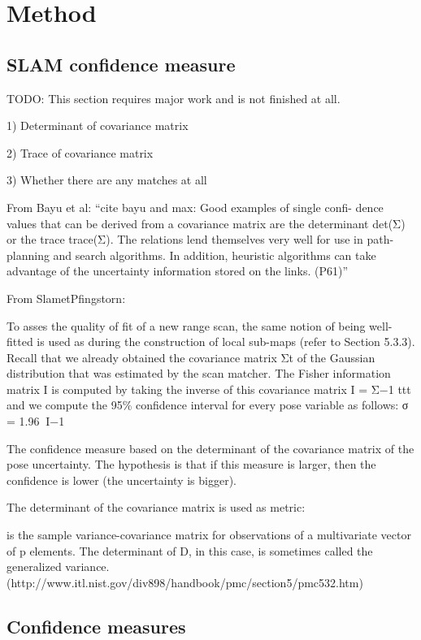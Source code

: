 \chapter{Method}
\label{method}

\section{SLAM confidence measure}
TODO: This section requires major work and is not finished at all.


1) Determinant of covariance matrix

2) Trace of covariance matrix

3) Whether there are any matches at all


From Bayu et al: ``cite bayu and max:     Good examples of single confi- dence values that can be derived from a covariance matrix are the determinant det(Σ) or the trace trace(Σ). The relations lend themselves very well for use in path-planning and search algorithms. In addition, heuristic algorithms can take advantage of the uncertainty information stored on the links. (P61)''


From SlametPfingstorn:

To asses the quality of fit
of a new range scan, the same notion of being well-fitted is used as during the construction
of local sub-maps (refer to Section 5.3.3). Recall that we already obtained the covariance
matrix Σt of the Gaussian distribution that was estimated by the scan matcher. The Fisher
information matrix I is computed by taking the inverse of this covariance matrix I = Σ−1 ttt
and we compute the 95\% confidence interval for every pose variable as follows: σ = 1.96􏰌􏰀I−1􏰁



The confidence measure based on the determinant of the covariance matrix of the pose uncertainty. The hypothesis is that if this measure is larger, then the confidence is lower (the uncertainty is bigger).

The determinant of the covariance matrix is used as metric:

is the sample variance-covariance matrix for observations of a multivariate vector of p elements. The determinant of D, in this case, is sometimes called the generalized variance. (http://www.itl.nist.gov/div898/handbook/pmc/section5/pmc532.htm)

\section{Confidence measures}


